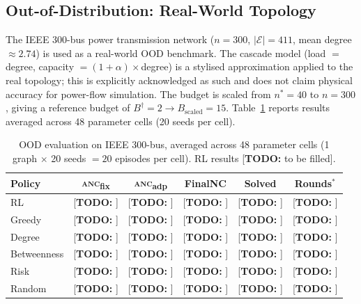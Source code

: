 \documentclass[11pt]{article}
\newcommand{\anc}{\textsc{anc}}
\newcommand{\ancfix}{\anc{}\textsubscript{fix}}
\newcommand{\ancadp}{\anc{}\textsubscript{adp}}
\newcommand{\todo}[1]{\textcolor{red!70!black}{[\textbf{TODO:} #1]}}
\newcommand{\nstar}{n^{*}}
\begin{document}
\subsection{Out-of-Distribution: Real-World Topology}
\label{sec:ood}

The IEEE 300-bus power transmission network
($n=300$, $|\mathcal{E}|=411$, mean degree $\approx 2.74$) is used as a
real-world OOD benchmark.
The cascade model (load $=$ degree, capacity $= (1+\alpha)\times$degree)
is a stylised approximation applied to the real topology; this is
explicitly acknowledged as such and does not claim physical accuracy for
power-flow simulation.
The budget is scaled from $\nstar=40$ to $n=300$, giving a reference
budget of $B^{\dagger}=2 \rightarrow B_{\text{scaled}}=15$.
Table~\ref{tab:ood} reports results averaged across 48 parameter cells
(20 seeds per cell).

\begin{table}[htbp]
\centering
\caption{OOD evaluation on IEEE 300-bus, averaged across 48 parameter
         cells (1 graph $\times$ 20 seeds $= 20$ episodes per cell).
         RL results \todo{to be filled}.}
\label{tab:ood}
\setlength{\tabcolsep}{6pt}
\begin{tabular}{lccccc}
\toprule
Policy      & \ancfix{} & \ancadp{} & FinalNC & Solved  & Rounds$^{*}$ \\
\midrule
RL          & \todo{}   & \todo{}   & \todo{} & \todo{} & \todo{} \\
Greedy      & \todo{}   & \todo{}   & \todo{} & \todo{} & \todo{} \\
Degree      & \todo{}   & \todo{}   & \todo{} & \todo{} & \todo{} \\
Betweenness & \todo{}   & \todo{}   & \todo{} & \todo{} & \todo{} \\
Risk        & \todo{}   & \todo{}   & \todo{} & \todo{} & \todo{} \\
Random      & \todo{}   & \todo{}   & \todo{} & \todo{} & \todo{} \\
\bottomrule
\end{tabular}
\end{table}

\end{document}
